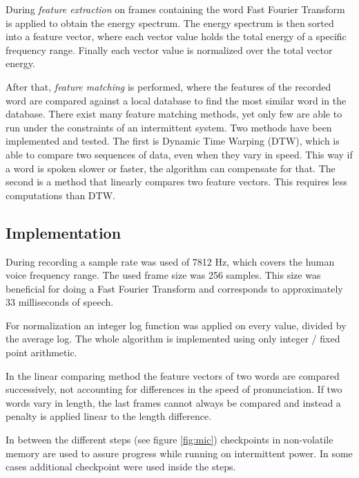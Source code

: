 
During \textit{feature extraction} on frames containing the word Fast Fourier Transform is applied to obtain the energy spectrum. 
The energy spectrum is then sorted into a feature vector, where each vector value holds the total energy of a specific frequency range. Finally each vector value is normalized over the total vector energy.

After that, \textit{feature matching} is performed, where the features of the recorded word are compared against a local database to find the most similar word in the database.
There exist many feature matching methods, yet only few are able to run under the constraints of an intermittent system.
Two methods have been implemented and tested. The first is Dynamic Time Warping (DTW), which is able to compare two sequences of data, even when they vary in speed. This way if a word is spoken slower or faster, the algorithm can compensate for that.
The second is a method that linearly compares two feature vectors. This requires less computations than DTW.


\subsection{Implementation}
During recording a sample rate was used of 7812 Hz, which covers the human voice frequency range. The used frame size was 256 samples. This size was beneficial for doing a Fast Fourier Transform and corresponds to approximately 33 milliseconds of speech.

For normalization an integer log function was applied on every value, divided by the average log.
The whole algorithm is implemented using only integer / fixed point arithmetic.

In the linear comparing method the feature vectors of two words are compared successively, not accounting for differences in the speed of pronunciation. If two words vary in length, the last frames cannot always be compared and instead a penalty is applied linear to the length difference.

In between the different steps (see figure \ref{fig:mic}) checkpoints in non-volatile memory are used to assure progress while running on intermittent power. In some cases additional checkpoint were used inside the steps.

